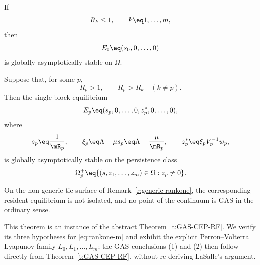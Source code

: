 \im
If
\[
R_k\leq1,
\qquad
k\eq1,\ldots,m,
\]
then
\[
E_0
\eq
(s_0,0,\ldots,0)
\]
is globally asymptotically stable on $\Omega$.

\im
Suppose that, for some $p$,
\[
R_p>1,
\qquad
R_p>R_k
\quad
(k\ne p).
\]
Then the single-block equilibrium
\[
E_p
\eq
(s_p,0,\ldots,0,z_p^*,0,\ldots,0),
\]
where
\[
s_p
\eq
\frac1{\mR_p},
\qquad
\xi_p
\eq
\Lambda-\mu s_p
\eq
\Lambda-\frac{\mu}{\mR_p},
\qquad
z_p^*
\eq
\xi_pV_p^{-1}w_p,
\]
is globally asymptotically stable on the persistence class
\[
\Omega_p^+
\eq
\{(s,z_1,\ldots,z_m)\in\Omega:z_p\ne0\}.
\]

\im
On the non-generic tie surface of Remark~\ref{r:generic-rankone}, the
corresponding resident equilibrium is not isolated, and no point of
the continuum is GAS in the ordinary sense.

\EEN
\eeT

This theorem is an instance of the abstract Theorem~\ref{t:GAS-CEP-RF}.
We verify its three hypotheses for \eqref{eq:rankone-m} and exhibit the
explicit Perron--Volterra Lyapunov family
$L_0,L_1,\ldots,L_m$; the GAS conclusions (1) and (2) then follow
directly from Theorem~\ref{t:GAS-CEP-RF}, without re-deriving
LaSalle's argument.

